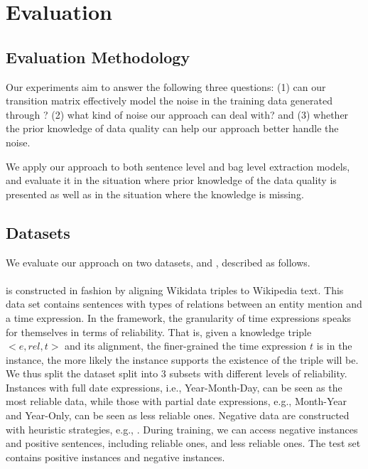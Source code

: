 \section{Evaluation}

\subsection{Evaluation Methodology}
Our experiments aim to answer the following three questions: (1) can our
transition matrix effectively model the noise in the training data generated
through \DS? (2) what kind of noise our approach can deal with? and (3)
whether the prior knowledge of data quality can help our approach better
handle the noise.

We apply our approach to both sentence level and bag level
extraction models, and evaluate it in the situation where prior knowledge of
the data quality is presented as well as in the situation where the 
knowledge is missing.


\subsection{Datasets}
We evaluate our approach on two datasets, \TimeRE and \EntityRE, described as follows.

\paragraph{\TimeRE} is constructed in \DS fashion by aligning Wikidata triples to
Wikipedia text. This data set contains  sentences with 
types of relations  between an entity mention and a time expression.  In the
\DS framework,   the granularity of time expressions speaks for themselves in
terms of reliability. That is, given a knowledge triple $<e, rel, t>$ and its
alignment,  the  finer-grained the time expression $t$ is in the instance,
the more likely the instance  supports the existence of the triple will be.
   We thus split the dataset  split into
3 subsets with different levels of reliability.  Instances with full date expressions, i.e.,
Year-Month-Day, can be seen as the most reliable data, while those with
partial date expressions, e.g., Month-Year and Year-Only, can be seen as less
reliable ones.  Negative data are constructed with heuristic strategies,
e.g.,  . During training, we can access   negative
instances and   positive sentences, including  reliable
ones,  and  less reliable ones. The test set contains
 positive instances and  negative instances.

